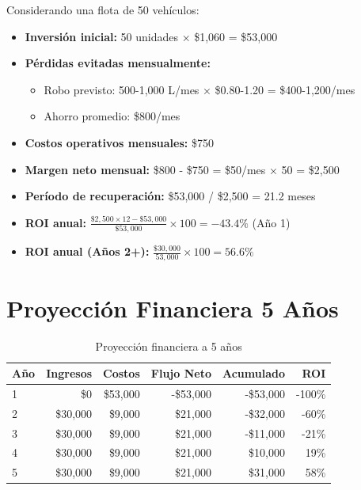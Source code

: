 \documentclass[12pt,a4paper,oneside]{report}
\begin{document}
Considerando una flota de 50 vehículos:

\begin{itemize}
    \item \textbf{Inversión inicial:} 50 unidades × \$1,060 = \$53,000
    
    \item \textbf{Pérdidas evitadas mensualmente:}
    \begin{itemize}
        \item Robo previsto: 500-1,000 L/mes × \$0.80-1.20 = \$400-1,200/mes
        \item Ahorro promedio: \$800/mes
    \end{itemize}
    
    \item \textbf{Costos operativos mensuales:} \$750
    
    \item \textbf{Margen neto mensual:} \$800 - \$750 = \$50/mes × 50 = \$2,500
    
    \item \textbf{Período de recuperación:} \$53,000 / \$2,500 = 21.2 meses
    
    \item \textbf{ROI anual:} $\frac{\$2,500 \times 12 - \$53,000}{\$53,000} \times 100 = -43.4\%$ (Año 1)
    
    \item \textbf{ROI anual (Años 2+):} $\frac{\$30,000}{53,000} \times 100 = 56.6\%$
\end{itemize}

\section{Proyección Financiera 5 Años}

\begin{table}[H]
    \centering
    \begin{tabular}{|l|r|r|r|r|r|}
        \hline
        \textbf{Año} & \textbf{Ingresos} & \textbf{Costos} & \textbf{Flujo Neto} & \textbf{Acumulado} & \textbf{ROI} \\
        \hline
        1 & \$0 & \$53,000 & -\$53,000 & -\$53,000 & -100\% \\
        2 & \$30,000 & \$9,000 & \$21,000 & -\$32,000 & -60\% \\
        3 & \$30,000 & \$9,000 & \$21,000 & -\$11,000 & -21\% \\
        4 & \$30,000 & \$9,000 & \$21,000 & \$10,000 & 19\% \\
        5 & \$30,000 & \$9,000 & \$21,000 & \$31,000 & 58\% \\
        \hline
    \end{tabular}
    \caption{Proyección financiera a 5 años}
\end{table}
\end{document}
